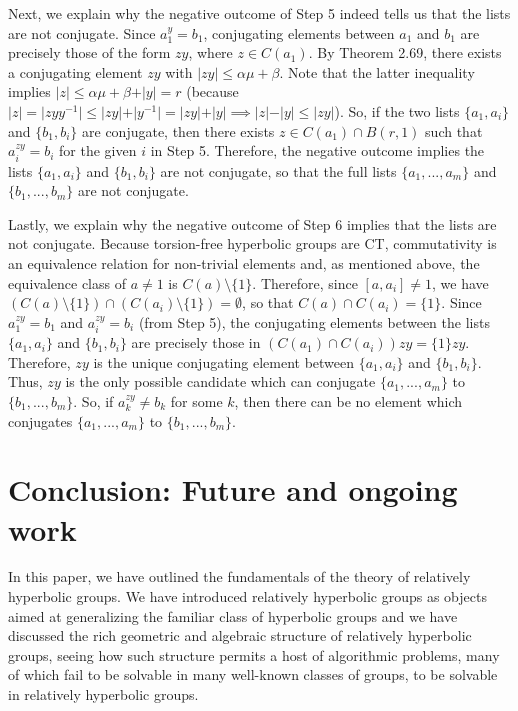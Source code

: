 \documentclass[12pt]{article}
\newcommand{\vs}{\vskip10pt}
\begin{document}
	\vs 
	
	Next, we explain why the negative outcome of Step 5 indeed tells us that the lists are not conjugate. Since $a_1^y = b_1$, conjugating elements between $a_1$ and $b_1$ are precisely those of the form $zy$, where $z \in C(a_1)$. By Theorem 2.69, there exists a conjugating element $zy$ with $\vert zy \vert \leq \alpha \mu + \beta$. Note that the latter inequality implies $\vert z \vert \leq \alpha \mu + \beta + \vert y \vert = r$ (because $\vert z \vert = \vert zyy^{-1} \vert \leq \vert zy \vert + \vert y^{-1} \vert  =  \vert zy \vert + \vert y \vert \implies \vert z \vert - \vert y \vert \leq \vert zy \vert $). So, if the two lists $\{a_1, a_i\}$ and $\{b_1, b_i\}$ are conjugate, then there exists $z \in C(a_1) \cap B(r,1)$ such that $a_i^{zy} = b_i$ for the given $i$ in Step 5. Therefore, the negative outcome implies the lists $\{a_1, a_i\}$ and $\{b_1, b_i\}$ are not conjugate, so that the full lists $\{a_1,...,a_m\}$ and $\{b_1,...,b_m\}$ are not conjugate. 
	
	\vs 
	
	Lastly, we explain why the negative outcome of Step 6 implies that the lists are not conjugate. Because torsion-free hyperbolic groups are CT, commutativity is an equivalence relation for non-trivial elements and, as mentioned above, the equivalence class of $a \neq 1$ is $C(a) \setminus \{1\}$. Therefore, since $[a, a_i] \neq 1$, we have $(C(a) \setminus \{1\}) \cap (C(a_i) \setminus \{1\}) = \emptyset$, so that $C(a) \cap C(a_i) = \{1\}$. Since $a_1^{zy} = b_1$ and $a_i^{zy} = b_i$ (from Step 5), the conjugating elements between the lists $\{a_1, a_i\}$ and $\{b_1, b_i\}$ are precisely those in $(C(a_1) \cap C(a_i))zy = \{1\}zy$. Therefore, $zy$ is the unique conjugating element between $\{a_1, a_i\}$ and $\{b_1, b_i\}$. Thus, $zy$ is the only possible candidate which can conjugate $\{a_1,...,a_m\}$ to $\{b_1,...,b_m\}$. So, if $a_k^{zy} \neq b_k$ for some $k$, then there can be no element which conjugates $\{a_1,...,a_m\}$ to $\{b_1,...,b_m\}$. 
	
	\newpage
	
	\section{Conclusion: Future and ongoing work}
	
	In this paper, we have outlined the fundamentals of the theory of relatively hyperbolic groups. We have introduced relatively hyperbolic groups as objects aimed at generalizing the familiar class of hyperbolic groups and we have discussed the rich geometric and algebraic structure of relatively hyperbolic groups, seeing how such structure permits a host of algorithmic problems, many of which fail to be solvable in many well-known classes of groups, to be solvable in relatively hyperbolic groups. 
	
\end{document}
